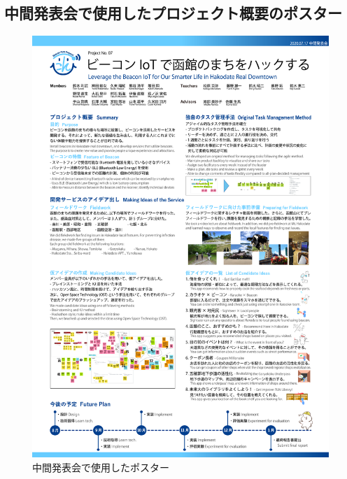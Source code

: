 \begin{appendix}

\chapter{中間発表会で使用したプロジェクト概要のポスター}
\begin{figure}[htbp]
    \begin{center}
    \includegraphics[width=13cm]{images/ProjectPosterBeaconFun4.png}
    \end{center}
    \caption{中間発表会で使用したポスター}
    \label{fig:ProjectPoster}
\end{figure}
\end{appendix}
